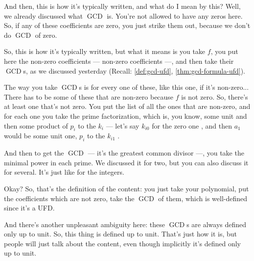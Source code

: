 \begin{speech}[00:02:55 - 00:04:53]
And then, this is how it's typically written, and what do I mean by this? Well, we already discussed what $\operatorname{GCD}$ is. You're not allowed to have any zeros here. So, if any of these coefficients are zero, you just strike them out, because we don't do $\operatorname{GCD}$ of zero.

So, this is how it's typically written, but what it means is you take $f$, you put here the non-zero coefficients  --- non-zero coefficients ---, and then take their $\operatorname{GCD}$s, as we discussed yesterday (Recall: \cref{def:gcd-ufd}, \cref{thm:gcd-formula-ufd}).

The way you take $\operatorname{GCD}$s is for every one of these, like this one, if it's non-zero... There has to be some of these that are non-zero because $f$ is not zero. So, there's at least one that's not zero. You put the list of all the ones that are non-zero, and for each one you take the prime factorization, which is, you know, some unit and then some product of $p_i$ to the $k_i$ --- let's say $k_{i0}$ for the zero one , and then $a_1$ would be some unit one, $p_i$ to the $k_{i1}$ .

And then to get the $\operatorname{GCD}$ --- it's the greatest common divisor ---, you take the minimal power in each prime. We discussed it for two, but you can also discuss it for several. It's just like for the integers.

Okay? So, that's the definition of the content: you just take your polynomial, put the coefficients which are not zero, take the $\operatorname{GCD}$ of them, which is well-defined since it's a UFD.

And there's another unpleasant ambiguity here: these $\operatorname{GCD}$s are always defined only up to unit. So, this thing is defined up to unit.  That's just how it is, but people will just talk about the content, even though implicitly it's defined only up to unit.
\end{speech}

